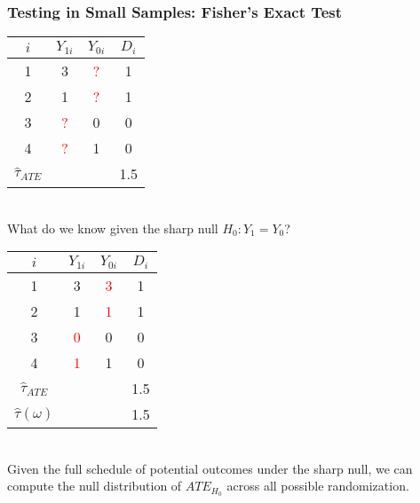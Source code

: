 \documentclass{beamer}
\numberwithin{equation}{section}
\begin{document}
\begin{frame}
\frametitle{Testing in Small Samples: Fisher's Exact Test}
\begin{overprint}
\begin{tabular}{cccc}
\multicolumn{1}{p{1cm}}{\center $i$} &   \multicolumn{1}{p{1cm}}{\center $Y_{1i}$} & \multicolumn{1}{p{1cm}}{\center $Y_{0i}$}&       \multicolumn{1}{p{1cm}}{\center $D_{i}$} \\
\hline
\rowcolor{gray!10}        1 &          3 &        \textcolor{red}{?} &                   1  \\
\rowcolor{gray!10}         2 &         1 &       \textcolor{red}{?} &                    1   \\
\rowcolor{gray!30}         3 &          \textcolor{red}{?} &         0 &                    0  \\
\rowcolor{gray!30}         4 &          \textcolor{red}{?} &         1 &                    0  \\
\hline
$\widehat{\tau}_{ATE}$    &                                &                       &   1.5      \\
\end{tabular}\bigskip\\
What do we know given the sharp null $H_0: Y_1 = Y_0$?
\begin{tabular}{cccc}
\multicolumn{1}{p{1cm}}{\center $i$} &   \multicolumn{1}{p{1cm}}{\center $Y_{1i}$} & \multicolumn{1}{p{1cm}}{\center $Y_{0i}$}&      \multicolumn{1}{p{1cm}}{\center $D_{i}$} \\
\hline
\rowcolor{gray!10}        1 &          3 &        \textcolor{red}{3} &                   1  \\
\rowcolor{gray!10}         2 &         1 &       \textcolor{red}{1} &                    1   \\
\rowcolor{gray!30}         3 &          \textcolor{red}{0} &         0 &                   0  \\
\rowcolor{gray!30}         4 &          \textcolor{red}{1} &         1 &                   0  \\
\hline
$\widehat{\tau}_{ATE}$    &                               &           &               1.5      \\
$\hat\tau(\omega)$    &                               &                       &  1.5         \\
\end{tabular}\bigskip\\
Given the full schedule of potential outcomes under the sharp null, we can compute the null distribution of $ATE_{H_0}$ across all possible randomization.

\end{overprint}
\end{frame}
\end{document}
